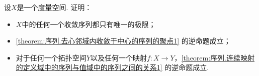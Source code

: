 

\begin{example}
设\(X\)是一个度量空间.
证明：\begin{itemize}
	\item \(X\)中的任何一个收敛序列都只有唯一的极限；
	\item \cref{theorem:序列.去心邻域内收敛于中心的序列的聚点1} 的逆命题成立；
	\item 对于任何一个拓扑空间\(Y\)以及任何一个映射\(f\colon X \to Y\)，\cref{theorem:序列.连续映射的定义域中的序列与值域中的序列之间的关系1} 的逆命题成立.
\end{itemize}
\end{example}
